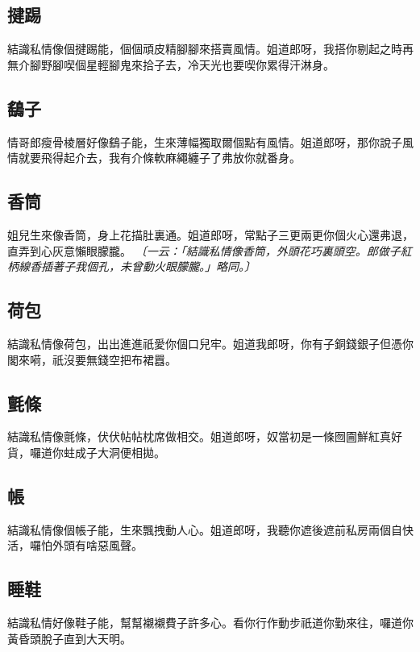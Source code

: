 \subsection*{揵踢}

結識私情像個揵踢能，個個頑皮精腳腳來搭賣風情。姐道郎呀，我搭你剔起之時再無介腳野腳喫個星輕腳鬼來拾子去，冷天光也要喫你累得汗淋身。

\subsection*{鷂子}

情哥郎瘦骨棱層好像鷂子能，生來薄幅獨取爾個點有風情。姐道郎呀，那你說子風情就要飛得起介去，我有介條軟麻繩纏子了弗放你就番身。

\subsection*{香筒}

姐兒生來像香筒，身上花描肚裏通。姐道郎呀，常點子三更兩更你個火心還弗退，直弄到心灰意懶眼朦朧。
\textit{〔一云：「結識私情像香筒，外頭花巧裏頭空。郎做子紅柄線香插著子我個孔，未曾動火眼朦朧。」略同。〕}

\subsection*{荷包}

結識私情像荷包，出出進進祇愛你個口兒牢。姐道我郎呀，你有子銅錢銀子但憑你閣來嗬，祇沒要無錢空把布裙囂。

\subsection*{氈條}

結識私情像氈條，伏伏帖帖枕席做相交。姐道郎呀，奴當初是一條囫圇鮮紅真好貨，囉道你蛀成子大洞便相拋。

\subsection*{帳}

結識私情像個帳子能，生來飄拽動人心。姐道郎呀，我聽你遮後遮前私房兩個自快活，囉怕外頭有啥惡風聲。

\subsection*{睡鞋}

結識私情好像鞋子能，幫幫襯襯費子許多心。看你行作動步祇道你勤來往，囉道你黃昏頭脫子直到大天明。

